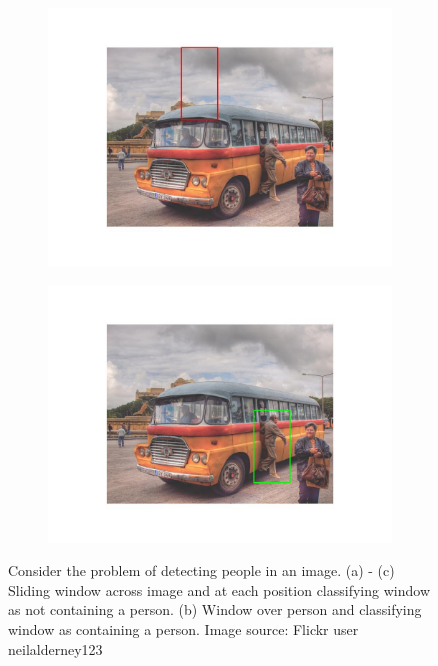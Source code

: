 \documentclass{article}
\begin{document}
\begin{figure}[H]
\begin{subfigure}{0.48\textwidth}
    \includegraphics[width=\linewidth]{sliding_window_c.jpg}
    \caption{}
  \end{subfigure}
  \hspace*{\fill} %
  \begin{subfigure}{0.48\textwidth}
    \includegraphics[width=\linewidth]{sliding_window_d.jpg}
    \caption{}
  \end{subfigure}
  \caption{Consider the problem of detecting people in an image. (a) - (c) Sliding window across image and at each position classifying window as not containing a person. (b) Window over person and classifying window as containing a person. Image source: Flickr user neilalderney123}
  \label{fig:sliding_window}
\end{figure}
\end{document}
